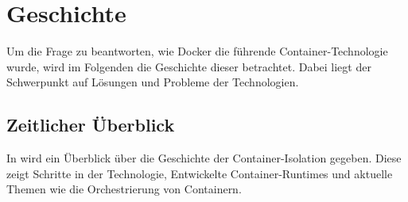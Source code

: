 \chapter{Geschichte}
\label{chap:geschichte}
Um die Frage zu beantworten, wie Docker die führende Container-Technologie wurde, wird im Folgenden die Geschichte dieser betrachtet. Dabei liegt der Schwerpunkt auf Lösungen und Probleme der Technologien.
\section{Zeitlicher Überblick}
 
\label{sec:timeline}
 
In  wird ein Überblick über die Geschichte der Container-Isolation gegeben. Diese zeigt Schritte in der Technologie, Entwickelte Container-Runtimes und aktuelle Themen wie die Orchestrierung von Containern.
 
